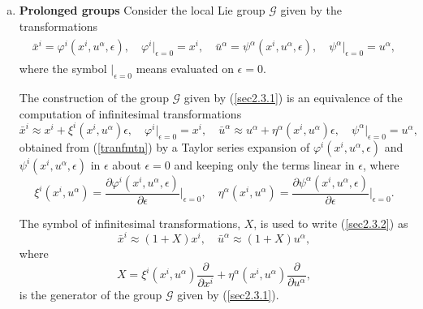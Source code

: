 \begin{enumerate}[(a)]
 \item \textbf{Prolonged groups} \newline
Consider the local Lie group $\mathcal{G}$ given by the transformations  \begin{align}
\begin{aligned}
\bar{x}^i = \varphi^i(x^i,u^{\alpha},\epsilon ), \quad \varphi^i\Big|_{\epsilon=0} = x^i,\quad 
\bar{u}^{\alpha } = \psi^{\alpha}(x^i,u^{\alpha},\epsilon),\quad \psi^{\alpha}\Big|_{\epsilon=0} = u^{\alpha },
\end{aligned} \label{sec2.3.1}
\end{align} where  the symbol $\Big|_{\epsilon=0} $ means evaluated on $\epsilon=0 $.
\begin{defn}
The construction of  the group $\mathcal{G}$ given by (\ref{sec2.3.1}) is an equivalence of  the computation of  infinitesimal transformations
\begin{equation} \bar{x}^i \approx x^i + \xi^i(x^i,u^{\alpha})  \epsilon, \quad \varphi^i\Big|_{\epsilon=0} = x^i,\quad \bar{u}^{\alpha } \approx u^{\alpha } + \eta^{\alpha} (x^i,u^{\alpha}) \epsilon,\quad \psi^{\alpha}\Big|_{\epsilon=0} = u^{\alpha }, \label{sec2.3.2}
\end{equation} obtained from (\ref{tranfmtn}) by a Taylor series expansion of  $ \varphi^i(x^i,u^{\alpha},\epsilon )$ and $ \psi^i(x^i,u^{\alpha},\epsilon )$ in $ \epsilon $ about $ \epsilon =0$ and keeping only the terms linear in $ \epsilon$, 
where \begin{equation} 
\xi^i(x^i,u^{\alpha}) = \frac{ \partial \varphi^i( x^i,u^{\alpha},\epsilon)}{ \partial \epsilon }\Big|_{\epsilon =0}, \quad  \eta^{\alpha}(x^i,u^{\alpha}) = \frac{ \partial \psi^{\alpha}( x^i,u^{\alpha},\epsilon)}{ \partial \epsilon }\Big|_{\epsilon =0}. \label{sec2.3.4}
\end{equation}
\end{defn}
\begin{rem}The symbol of infinitesimal transformations, $X$, is used to write (\ref{sec2.3.2}) as \begin{equation}
	\bar{x}^i \approx (1+X)x^i, \quad \bar{u}^{\alpha } \approx (1+X)u^{\alpha},\label{sec2.3.5}
	\end{equation} where  \begin{equation}
	X =  \xi^i(x^i,u^{\alpha}) \frac{ \partial }{ \partial x^i} + \eta^{\alpha}(x^i,u^{\alpha})  \frac{ \partial }{ \partial u^{\alpha }},	\label{sec2.3.6}
	\end{equation} is the generator  of the group $\mathcal{G}$ given by (\ref{sec2.3.1}).
\end{rem}


\end{enumerate}
